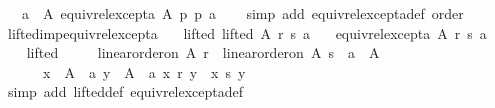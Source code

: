 \begin{isabellebody}
\ \ \ {\isachardoublequoteopen}{\isasymforall}a\ {\isasymin}\ A{\isachardot}{\kern0pt}\ equiv{\isacharunderscore}{\kern0pt}rel{\isacharunderscore}{\kern0pt}except{\isacharunderscore}{\kern0pt}a\ A\ p\ p\ a{\isachardoublequoteclose}\isanewline
%
\isadelimproof
\ \ %
\endisadelimproof
%
\isatagproof
{}\isamarkupfalse%
\ {\isacharparenleft}{\kern0pt}simp\ add{\isacharcolon}{\kern0pt}\ equiv{\isacharunderscore}{\kern0pt}rel{\isacharunderscore}{\kern0pt}except{\isacharunderscore}{\kern0pt}a{\isacharunderscore}{\kern0pt}def\ order{\isacharparenright}{\kern0pt}%
\endisatagproof
{\isafoldproof}%
%
\isadelimproof
\isanewline
%
\endisadelimproof
\isanewline
{}\isamarkupfalse%
\ lifted{\isacharunderscore}{\kern0pt}imp{\isacharunderscore}{\kern0pt}equiv{\isacharunderscore}{\kern0pt}rel{\isacharunderscore}{\kern0pt}except{\isacharunderscore}{\kern0pt}a{\isacharcolon}{\kern0pt}\isanewline
\ \ \ lifted{\isacharcolon}{\kern0pt}\ {\isachardoublequoteopen}lifted\ A\ r\ s\ a{\isachardoublequoteclose}\isanewline
\ \ \ {\isachardoublequoteopen}equiv{\isacharunderscore}{\kern0pt}rel{\isacharunderscore}{\kern0pt}except{\isacharunderscore}{\kern0pt}a\ A\ r\ s\ a{\isachardoublequoteclose}\isanewline
%
\isadelimproof
%
\endisadelimproof
%
\isatagproof
{}\isamarkupfalse%
\ {\isacharminus}{\kern0pt}\isanewline
\ \ \isamarkupfalse%
\ lifted\ \isamarkupfalse%
\isanewline
\ \ \ \ {\isachardoublequoteopen}linear{\isacharunderscore}{\kern0pt}order{\isacharunderscore}{\kern0pt}on\ A\ r\ {\isasymand}\ linear{\isacharunderscore}{\kern0pt}order{\isacharunderscore}{\kern0pt}on\ A\ s\ {\isasymand}\ a\ {\isasymin}\ A\ {\isasymand}\isanewline
\ \ \ \ \ \ {\isacharparenleft}{\kern0pt}{\isasymforall}x\ {\isasymin}\ A\ {\isacharminus}{\kern0pt}\ {\isacharbraceleft}{\kern0pt}a{\isacharbraceright}{\kern0pt}{\isachardot}{\kern0pt}\ {\isasymforall}y\ {\isasymin}\ A\ {\isacharminus}{\kern0pt}\ {\isacharbraceleft}{\kern0pt}a{\isacharbraceright}{\kern0pt}{\isachardot}{\kern0pt}\ x\ {\isasympreceq}\isactrlsub r\ y\ {\isasymlongleftrightarrow}\ x\ {\isasympreceq}\isactrlsub s\ y{\isacharparenright}{\kern0pt}{\isachardoublequoteclose}\isanewline
\ \ \ \ \isamarkupfalse%
\ {\isacharparenleft}{\kern0pt}simp\ add{\isacharcolon}{\kern0pt}\ lifted{\isacharunderscore}{\kern0pt}def\ equiv{\isacharunderscore}{\kern0pt}rel{\isacharunderscore}{\kern0pt}except{\isacharunderscore}{\kern0pt}a{\isacharunderscore}{\kern0pt}def{\isacharparenright}{\kern0pt}\isanewline
\ \ \isamarkupfalse%

\end{isabellebody}
